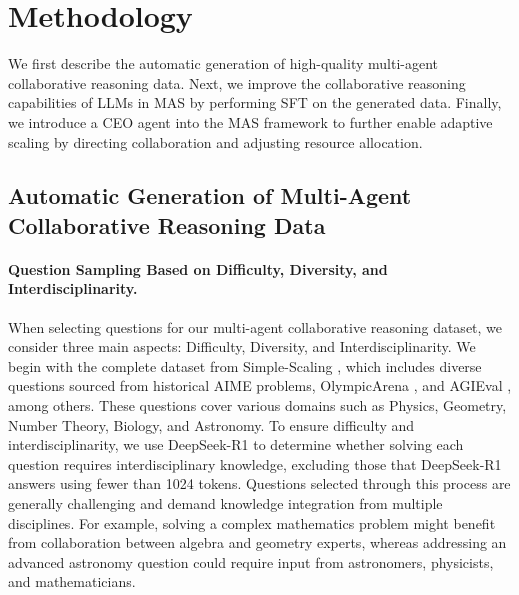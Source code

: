 \section{Methodology}

We first describe the automatic generation of high-quality multi-agent collaborative reasoning data. Next, we improve the collaborative reasoning capabilities of LLMs in MAS by performing SFT on the generated data. Finally, we introduce a CEO agent into the MAS framework to further enable adaptive scaling by directing collaboration and adjusting resource allocation.

\subsection{Automatic Generation of Multi-Agent Collaborative Reasoning Data}

\paragraph{Question Sampling Based on Difficulty, Diversity, and Interdisciplinarity.}
When selecting questions for our multi-agent collaborative reasoning dataset, we consider three main aspects:  Difficulty,  Diversity, and  Interdisciplinarity. We begin with the complete dataset from Simple-Scaling \citep{s1}, which includes diverse questions sourced from historical AIME problems, OlympicArena \citep{olympicarena}, and AGIEval \citep{agieval}, among others. These questions cover various domains such as Physics, Geometry, Number Theory, Biology, and Astronomy. To ensure difficulty and interdisciplinarity, we use DeepSeek-R1 \citep{r1} to determine whether solving each question requires interdisciplinary knowledge, excluding those that DeepSeek-R1 answers using fewer than 1024 tokens. Questions selected through this process are generally challenging and demand knowledge integration from multiple disciplines. For example, solving a complex mathematics problem might benefit from collaboration between algebra and geometry experts, whereas addressing an advanced astronomy question could require input from astronomers, physicists, and mathematicians.

